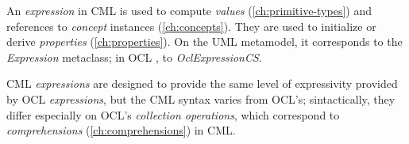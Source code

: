 An \emph{expression} in CML is used to compute
\emph{values} (\ref{ch:primitive-types})
and references to \emph{concept} instances (\ref{ch:concepts}).
They are used to initialize or derive \emph{properties} (\ref{ch:properties}).
On the UML \cite{uml} metamodel,
it corresponds to the \emph{Expression} metaclass;
in OCL \cite{ocl}, to \emph{OclExpressionCS}.

CML \emph{expressions} are designed to provide the same level of
expressivity provided by OCL \emph{expressions},
but the CML syntax varies from OCL's;
sintactically, they differ especially on OCL's \emph{collection operations},
which correspond to \emph{comprehensions} (\ref{ch:comprehensions}) in CML.
